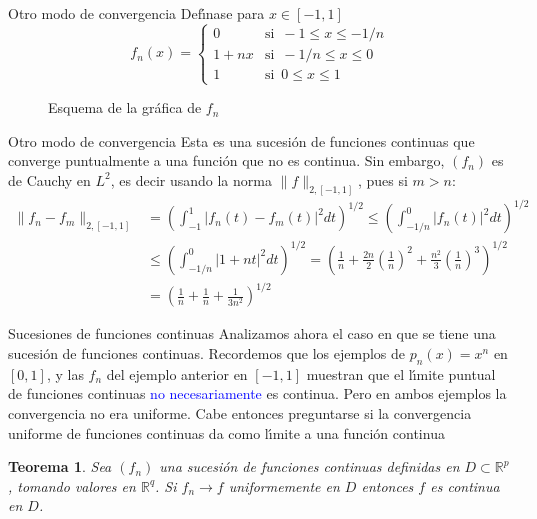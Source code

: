 \documentclass[xcolor=dvipsnames,10pt,handout, draft]{beamer}
\newcommand{\incfig}[1]{%
    \def\svgwidth{3.5in}
    {#1.pdf_tex}
}
\newcommand{\rzp}{\mathbb R^{p}}
\newcommand{\rzq}{\mathbb R^{q}}
\newtheorem*{teo}{Teorema}
\begin{document}
\begin{frame}{Otro modo de convergencia}
Def\'\i nase para $x\in[-1,1]$
$$f_n(x)=\left\{\begin{array}{ll}
			0&\text{si }\,-1\leq x\leq -1/n\\
			1+nx&\text{si }\,-1/n\leq x\leq 0\\
			1&\text{si }\,0\leq x\leq 1
		\end{array}\right.$$
\begin{figure}[ht]
    \centering
\caption{Esquema de la gr\'afica de $f_n$}
\end{figure}
\end{frame}


\begin{frame}{Otro modo de convergencia}
Esta es una sucesi\'on de funciones continuas que converge puntualmente a una funci\'on que no es continua.
\vskip4pt\pause
Sin embargo, $(f_n)$ es de Cauchy en $L^2$, es decir usando la norma $\displaystyle\|f\|_{2,[-1,1]}$, pues si $m>n$:
\begin{align*}
\|f_n-f_m\|_{2,[-1,1]}&=\left(\int_{-1}^1|f_n(t)-f_m(t)|^2dt\right)^{1/2}\leq\left(\int_{-1/n}^0|f_n(t)|^2dt\right)^{1/2}\\
&\leq\left(\int_{-1/n}^0|1+nt|^2dt\right)^{1/2}=\left(\frac{1}{n}+\frac{2n}{2}\left(\frac{1}{n}\right)^2+\frac{n^2}{3}\left(\frac{1}{n}\right)^3\right)^{1/2}\\
&=\left(\frac{1}{n}+\frac{1}{n}+\frac{1}{3n^2}\right)^{1/2}
\end{align*}
\end{frame}


\begin{frame}{Sucesiones de funciones continuas}
Analizamos ahora el caso en que se tiene una sucesi\'on de funciones continuas.
\vskip6pt\pause
Recordemos que los ejemplos de $p_n(x)=x^n$ en $[0,1]$, y las $f_n$ del ejemplo anterior en $[-1,1]$ muestran que el l\'\i mite puntual de funciones continuas \textcolor{blue}{no necesariamente} es continua.
\vskip6pt\pause
Pero en ambos ejemplos la convergencia no era uniforme. \pause Cabe entonces preguntarse si la convergencia uniforme de funciones continuas da como l\'\i mite a una funci\'on continua \pause

\begin{teo}
Sea $(f_n)$ una sucesi\'on de funciones continuas definidas en $D\subset\rzp$, tomando valores en $\rzq$. Si $f_n\to f$ uniformemente en $D$ entonces $f$ es continua en $D$.
\end{teo}
\end{frame}
\end{document}

